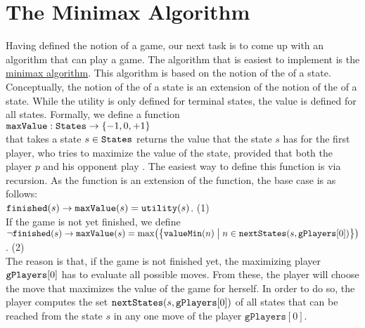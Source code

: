 \section{The Minimax Algorithm \label{sec:minimax}}
Having defined the notion of a game, our next task is to come up with an algorithm that can play a game.  The
algorithm that is easiest to implement is the \href{https://en.wikipedia.org/wiki/Minimax}{minimax algorithm}.  This
algorithm is based on the notion of the  of a state. 
Conceptually, the notion of the  of a state is an extension of the notion of the 
 of a state.  While the utility is only defined for terminal
states, the value is defined for all states.  Formally, we define a function
\\[0.2cm]
\hspace*{1.3cm}
$\texttt{maxValue}: \texttt{States} \rightarrow \{-1, 0, +1\}$
\\[0.2cm]
that takes a state $s \in \texttt{States}$ returns the value that the state $s$ has for the first player, who
tries to maximize the value of the state, provided that both the player $p$ and his opponent play
.  The easiest way to define this function is via recursion.  As the 
 function is an extension of the  function, the base case is as follows:
\\[0.2cm]
\hspace*{0.3cm}
$\texttt{finished}(s) \rightarrow \texttt{maxValue}(s) = \texttt{utility}(s)$. \hspace*{\fill} (1)
\\[0.2cm]
If the game is not yet finished, we define
\\[0.2cm]
\hspace*{0.3cm}
$\neg \texttt{finished}(s) \rightarrow 
 \texttt{maxValue}(s) = \max\bigl(\bigl\{
                     \texttt{valueMin}(n) \bigm| n \in \texttt{nextStates}(s, \mathtt{gPlayers}[0])
                     \bigr\}\bigr)
$.  \hspace*{\fill} (2)
\\[0.2cm]
The reason is that, if the game is not finished yet, the maximizing player $\texttt{gPlayers}[0]$ has to
evaluate all possible moves.   
From these, the player will choose the move that maximizes the value of the game for herself.  In order to
do so, the player computes the set 
$\texttt{nextStates}(s, \mathtt{gPlayers}[0])$ of all states that can be reached from the state $s$ in any one move of the player $\mathtt{gPlayers}[0]$.
